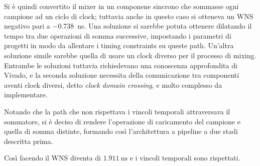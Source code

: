 Si è quindi convertito il mixer in un componene sincrono che sommasse ogni campione
ad un ciclo di clock; tuttavia anche in questo caso si otteneva un WNS negativo pari
a \SI{-0.738}{\nano\second}.
Una soluzione si sarebbe potuta ottenere dilatando il tempo tra due operazioni di somma
successive, impostando i parametri di progetti in modo da allentare i timing constraints
su queste path.
Un'altra soluzione simile sarebbe quella di usare un clock diverso per il processo di mixing.
Entrambe le soluzioni tuttavia richiedevano una conoscenza approfondita di Vivado,
e la seconda soluzione necessita della comunicazione tra componenti aventi 
clock diversi, detto \textit{clock domain crossing}, e molto complesso da
implementare.

Notando che la path che non rispettava i vincoli temporali attraversava
il sommatore, si è deciso di rendere l'operazione di caricamento del campione
e quella di somma distinte, formando così l'architettura a pipeline a due stadi descritta prima.

Così facendo il WNS diventa di $\SI{1.911}{\nano \second}$ e i vincoli temporali sono rispettati.
